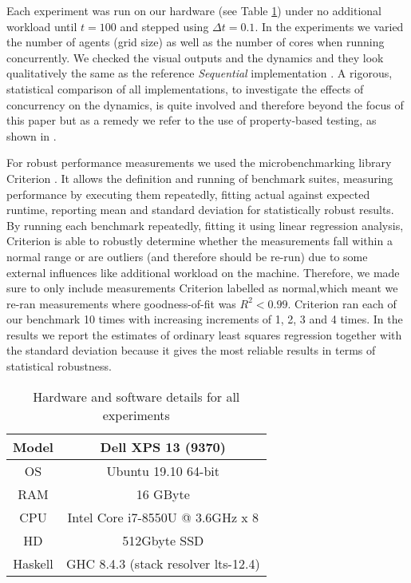 Each experiment was run on our hardware (see Table \ref{tab:machine_specs}) under no additional workload until $t = 100$ and stepped using $\Delta t = 0.1$. In the experiments we varied the number of agents (grid size) as well as the number of cores when running concurrently. We checked the visual outputs and the dynamics and they look qualitatively the same as the reference \textit{Sequential} implementation \cite{thaler_pure_2018}. A rigorous, statistical comparison of all implementations, to investigate the effects of concurrency on the dynamics, is quite involved and therefore beyond the focus of this paper but as a remedy we refer to the use of property-based testing, as shown in \cite{thaler_show_2019}.

For robust performance measurements we used the microbenchmarking library Criterion \cite{criterion_serpentine, criterion_hackage}. It allows the definition and running of benchmark suites, measuring performance by executing them repeatedly, fitting actual against expected runtime, reporting mean and standard deviation for statistically robust results. By running each benchmark repeatedly, fitting it using linear regression analysis, Criterion is able to robustly determine whether the measurements fall within a normal range or are outliers (and therefore should be re-run) due to some external influences like additional workload on the machine. Therefore, we made sure to only include measurements Criterion labelled as normal,which meant we re-ran measurements where goodness-of-fit was $R^2 < 0.99$. Criterion ran each of our benchmark 10 times with increasing increments of 1, 2, 3 and 4 times. In the results we report the estimates of ordinary least squares regression together with the standard deviation because it gives the most reliable results in terms of statistical robustness. 

\begin{table}
	\centering
	\begin{tabular}{ c || c }
		Model   & Dell XPS 13 (9370)				    \\ \hline
		OS      & Ubuntu 19.10 64-bit 				\\ \hline
		RAM     & 16 GByte 							\\ \hline
		CPU     & Intel Core i7-8550U @ 3.6GHz x 8 	\\ \hline
		HD      & 512Gbyte SSD 						\\ \hline
		Haskell & GHC 8.4.3 (stack resolver lts-12.4)
	\end{tabular}
	
	\caption{Hardware and software details for all experiments}
	\label{tab:machine_specs}
\end{table}


